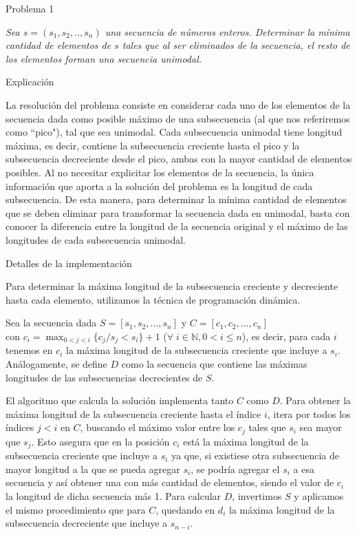 \begin{section}{Problema 1}

	\textit{Sea $s = (s_1,s_2,..,s_n)$ una secuencia de números enteros. Determinar la mínima cantidad de elementos de $s$ tales que al ser eliminados de la secuencia, el resto de los elementos forman una secuencia unimodal.}

	\begin{subsection}{Explicación}

		La resolución del problema consiste en considerar cada uno de los elementos de la secuencia dada como
		posible máximo de una subsecuencia (al que nos referiremos como ``pico"), tal que sea unimodal. Cada 
		subsecuencia unimodal tiene longitud máxima, es decir, contiene la subsecuencia creciente hasta el pico
		y la subsecuencia decreciente desde el pico, ambas con la mayor cantidad de elementos posibles. Al no
		necesitar explicitar los elementos de la secuencia, la única información que aporta a la solución del
		problema es la longitud de cada subsecuencia. De esta manera, para determinar la mínima cantidad de
		elementos que se deben eliminar para transformar la secuencia dada en unimodal, basta con conocer
		la diferencia entre la longitud de la secuencia original y el máximo de las longitudes de cada
		subsecuencia unimodal. 		

	\end{subsection}


	\begin{subsection}{Detalles de la implementación}
		
		Para determinar la máxima longitud de la subsecuencia creciente y decreciente hasta cada elemento,
		utilizamos la técnica de programación dinámica.
		
		Sea la secuencia dada $S=[s_1,s_2,...,s_n]$ y $C=[c_1,c_2,...,c_n]$ \\
		con $c_i=\displaystyle\max_{0<j<i}\{ c_j / s_j < s_i \}+1$ ($\forall\;i\in\mathbb{N}, 0<i\leq n$), es 
		decir, para cada $i$ tenemos en $c_i$ la máxima longitud de la subsecuencia creciente que incluye a
		$s_i$. Análogamente, se define $D$ como la secuencia que contiene las máximas longitudes de las
		subsecuencias decrecientes de $S$.
		
		El algoritmo que calcula la solución implementa tanto $C$ como $D$.	
		Para obtener la máxima longitud de la subsecuencia creciente hasta el índice $i$, itera
		por todos los índices $j<i$ en $C$, buscando el máximo valor entre los $c_j$ tales que $s_i$ sea mayor
		que	$s_j$. 
		Esto asegura que en la posición $c_i$ está la máxima longitud de la subsecuencia creciente
		que incluye a $s_i$ ya que, si existiese otra subsecuencia de mayor longitud a la que se pueda 
		agregar $s_i$, se podría agregar el $s_i$ a esa secuencia y así obtener una con más cantidad de 
		elementos, siendo el valor de $c_i$ la longitud de dicha secuencia más 1. Para calcular $D$,
		invertimos $S$ y aplicamos el mismo	procedimiento que para $C$, quedando en $d_i$ la máxima longitud
		de la subsecuencia decreciente que incluye a $s_{n-i}$.


\end{subsection}
\end{section}
